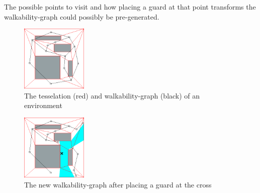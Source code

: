 The possible points to visit and how placing a guard at that point transforms the walkability-graph could possibly be pre-generated.

\begin{figure}[h!t]
	\begin{center}
	\includegraphics[width=119px]{fig/2graph.png}
	\end{center}
	\caption{The tesselation (red) and walkability-graph (black) of an environment}
	\label{searchDestroy}
\end{figure}

\begin{figure}[h!t]
	\begin{center}
	\includegraphics[width=119px]{fig/2graph2.png}
	\end{center}
	\caption{The new walkability-graph after placing a guard at the cross}
	\label{searchDestroy2}
\end{figure}
